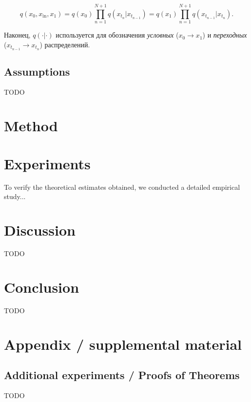 \documentclass{article}
\begin{document}
\[
q(x_0, x_{\text{in}}, x_1) = q(x_0) \prod_{n=1}^{N+1} q(x_{t_n} | x_{t_{n-1}}) = q(x_1) \prod_{n=1}^{N+1} q(x_{t_{n-1}} | x_{t_n}).
\]

Наконец, \(q(\cdot|\cdot)\) используется для обозначения \textit{условных} (\(x_0 \to x_1\)) и \textit{переходных} (\(x_{t_{n-1}} \to x_{t_n}\)) распределений.

\subsection{Assumptions} 

TODO

\section{Method}\label{sec:method}

\section{Experiments}\label{sec:exp}

To verify the theoretical estimates obtained, we conducted a detailed empirical study...

\section{Discussion}\label{sec:disc}

TODO

\section{Conclusion}\label{sec:concl}

TODO







\newpage
\appendix
\section{Appendix / supplemental material}\label{app}

\subsection{Additional experiments / Proofs of Theorems}\label{app:exp}

TODO
\end{document}
